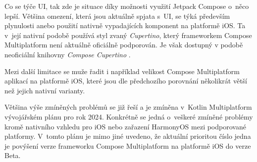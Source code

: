 Co se týče UI, tak zde je situace díky možnosti využití Jetpack Compose o~něco lepší. Většina omezení, která jsou
aktuálně spjata s~UI, se týká především plynulosti anebo použití nativně vypadajících komponent na platformě iOS.
Ta v~její nativní podobě používá styl zvaný \textit{Cupertino}, který frameworkem Compose Multiplatform 
není aktuálně oficiálně podporován. Je však dostupný v podobě neoficiální knihovny \textit{Compose Cupertino} \cite{cupertinoCompoes}.

Mezi další limitace se muže řadit i například velikost Compose Multiplatform aplikací na platformě iOS, které jsou dle
předchozího porovnání několikrát větší než jejich nativní varianty.

\bigskip

Většina výše zmíněných problémů se již řeší a je zmíněna v~Kotlin Multiplatform vývojářském plánu pro rok 2024. \cite{KMPRoaddMap} Konkrétně
se jedná o~veškeré zmíněné problémy kromě nativního vzhledu pro iOS nebo zařazení HarmonyOS mezi podporované platformy. %
V~tomto plánu je mimo jiné uvedeno, že aktuální prioritou číslo jedna je povýšení verze frameworku Compose Multiplatform na platformě iOS do verze Beta. \cite{KMPRoaddMap}
